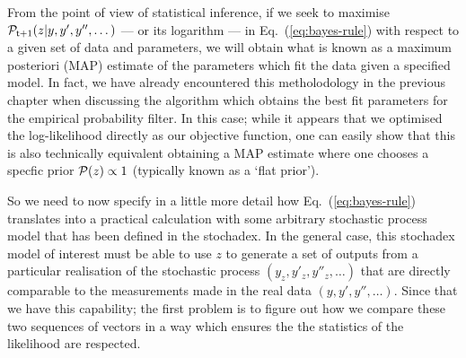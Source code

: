 From the point of view of statistical inference, if we seek to maximise ${\cal P}_{{\sf t}+1}(z \vert y, y', y'', \dots)$ --- or its logarithm --- in Eq.~(\ref{eq:bayes-rule}) with respect to a given set of data and parameters, we will obtain what is known as a maximum posteriori (MAP) estimate of the parameters which fit the data given a specified model. In fact, we have already encountered this metholodology in the previous chapter when discussing the algorithm which obtains the best fit parameters for the empirical probability filter. In this case; while it appears that we optimised the log-likelihood directly as our objective function, one can easily show that this is also technically equivalent obtaining a MAP estimate where one chooses a specfic prior ${\cal P} (z) \propto 1$ (typically known as a `flat prior').

So we need to now specify in a little more detail how Eq.~(\ref{eq:bayes-rule}) translates into a practical calculation with some arbitrary stochastic process model that has been defined in the stochadex. In the general case, this stochadex model of interest must be able to use $z$ to generate a set of outputs from a particular realisation of the stochastic process $(y_z, y'_z, y''_z, \dots)$ that are directly comparable to the measurements made in the real data $(y, y', y'', \dots)$. Since that we have this capability; the first problem is to figure out how we compare these two sequences of vectors in a way which ensures the the statistics of the likelihood are respected. 

